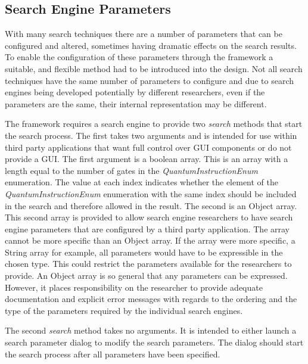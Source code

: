\subsection{Search Engine Parameters}
With many search techniques there are a number of parameters that can be configured and altered, sometimes having dramatic effects on the search results.
To enable the configuration of these parameters through the framework a suitable, and flexible method had to be introduced into the design.
Not all search techniques have the same number of parameters to configure and due to search engines being developed potentially by different researchers, even if the parameters are the same, their internal representation may be different.

The framework requires a search engine to provide two \emph{search} methods that start the search process.
The first takes two arguments and is intended for use within third party applications that want full control over GUI components or do not provide a GUI.
The first argument is a boolean array.
This is an array with a length equal to the number of gates in the \emph{QuantumInstructionEnum} enumeration.
The value at each index indicates whether the element of the \emph{QuantumInstructionEnum} enumeration with the same index should be included in the search and therefore allowed in the result.
The second is an Object array.
This second array is provided to allow search engine researchers to have search engine parameters that are configured by a third party application.
The array cannot be more specific than an Object array.
If the array were more specific, a String array for example, all parameters would have to be expressible in the chosen type.
This could restrict the parameters available for the researchers to provide.
An Object array is so general that any parameters can be expressed.
However, it places responsibility on the researcher to provide adequate documentation and explicit error messages with regards to the ordering and the type of the parameters required by the individual search engines.

The second \emph{search} method takes no arguments.
It is intended to either launch a search parameter dialog to modify the search parameters.
The dialog should start the search process after all parameters have been specified.

